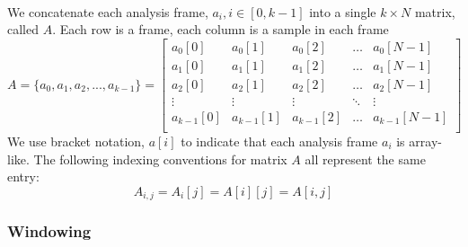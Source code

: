 \documentclass[12pt,letterpaper]{article}
\begin{document}
\paragraph*{}We concatenate each analysis frame, $a_{i}, i \in [0,k-1]$ into a single $k \times N$ matrix, called $A$. Each row is a frame, each column is a sample in each frame
\begin{equation}
\label{eqn-FrameMatrix}
A = \big\{ a_{0} , a_{1} , a_{2} , ... , a_{k-1} \big\} = 
\begin{bmatrix}
a_{0}[0] & a_{0}[1] & a_{0}[2] & \hdots & a_{0}[N-1] \\
a_{1}[0] & a_{1}[1] & a_{1}[2] & \hdots & a_{1}[N-1] \\
a_{2}[0] & a_{2}[1] & a_{2}[2] & \hdots & a_{2}[N-1] \\
\vdots 		& \vdots 	  & \vdots 		& \ddots & \vdots        \\
a_{k-1}[0] & a_{k-1}[1] & a_{k-1}[2] & \hdots & a_{k-1}[N-1] \\
\end{bmatrix}
\end{equation}
We use bracket notation, $a[i]$ to indicate that each analysis frame $a_i$ is array-like. The following indexing conventions for matrix $A$ all represent the same entry:
\begin{equation}
\label{eqn-IndexingA}
A_{i,j} = A_i[j] = A[i][j] = A[i,j]
\end{equation}


\subsubsection{Windowing}
\label{subsubsec-Windowing}
\end{document}
